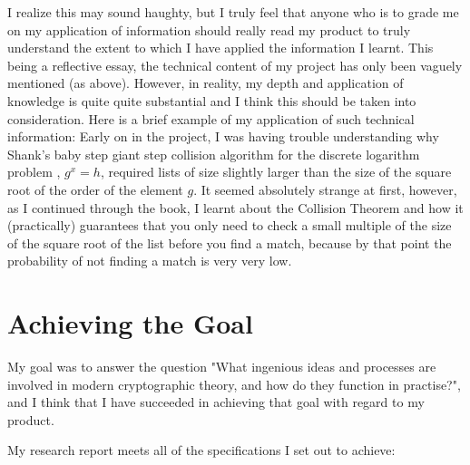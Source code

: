 \documentclass[12pt, a4paper, final]{report}
\begin{document}
I realize this may sound haughty, but I truly feel that anyone who is to
grade me on my application of information should really read my product to
truly understand the extent to which I have applied the information I
learnt. This being a reflective essay, the technical content of my project
has only been vaguely mentioned (as above). However, in reality, my depth
and application of knowledge is quite quite substantial and I think this
should be taken into consideration. Here is a brief example of my
application of such technical information: Early on in the project, I was
having trouble understanding why Shank's baby step giant step collision
algorithm for the discrete logarithm problem \cite[p.~63]{silverman},
$g^x = h$, required lists of size slightly larger than the size of the square
root of the order of the element $g$. It seemed absolutely strange at first,
however, as I continued through the book, I learnt about the Collision Theorem
\cite[p.~228]{silverman} and how it (practically) guarantees that you only
need to check a small multiple of the size of the square root of the list
before you find a match, because by that point the probability of not finding
a match is very very low.

\section*{Achieving the Goal}

My goal was to answer the question "What ingenious ideas and processes
are involved in modern cryptographic theory, and how do they function
in practise?", and I think that I have succeeded in achieving that goal
with regard to my product.

My research report meets all of the specifications I set out to
achieve:
\end{document}

